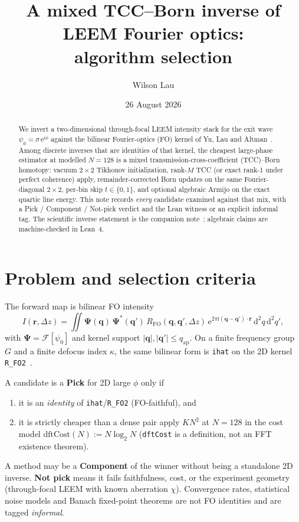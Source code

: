 \documentclass[11pt,a4paper]{article}
\title{A mixed TCC--Born inverse of LEEM Fourier optics:\\
algorithm selection}
\author{Wilson Lau}
\date{26 August 2026}
\theoremstyle{definition}
\theoremstyle{remark}
\newcommand{\ee}{\mathrm{e}}
\newcommand{\ii}{\mathrm{i}}
\newcommand{\dd}{\mathrm{d}}
\newcommand{\abs}[1]{\lvert#1\rvert}
\newcommand{\qap}{q_{\mathrm{ap}}}
\newcommand{\Dz}{\Delta z}
\newcommand{\RFO}{R_{\mathrm{FO}}}
\begin{document}
\maketitle

\begin{abstract}
We invert a two-dimensional through-focal LEEM intensity stack for the
exit wave $\psi_0=\sigma\,\ee^{\ii\phi}$ against the bilinear
Fourier-optics (FO) kernel of Yu, Lau and Altman~\cite{Yu2019}.
Among discrete inverses that are identities of that kernel, the
cheapest large-phase estimator at modelled $N=128$ is a mixed
transmission-cross-coefficient (TCC)--Born homotopy: vacuum
$2\times 2$ Tikhonov initialization, rank-$M$ TCC (or exact rank-1
under perfect coherence) apply, remainder-corrected Born updates on
the same Fourier-diagonal $2\times 2$, per-bin skip
$t\in\{0,1\}$, and optional algebraic Armijo on the exact quartic line
energy.
This note records \emph{every} candidate examined against that mix,
with a Pick / Component / Not-pick verdict and the Lean witness or
an explicit informal tag.
The scientific inverse statement is the companion
note~\cite{Lau2026inverse}; algebraic claims are machine-checked in
Lean~4.
\end{abstract}

\section{Problem and selection criteria}
\label{sec:criteria}

The forward map is bilinear FO intensity~\cite{Yu2019}
\begin{equation}
\label{eq:I}
I(\mathbf{r},\Dz)
=\iint
\boldsymbol{\Psi}(\mathbf{q})\,\boldsymbol{\Psi}^*(\mathbf{q}')
\,\RFO(\mathbf{q},\mathbf{q}',\Dz)
\,\ee^{2\pi\ii(\mathbf{q}-\mathbf{q}')\cdot\mathbf{r}}
\,\dd^2q\,\dd^2q',
\end{equation}
with $\boldsymbol{\Psi}=\mathcal{F}[\psi_0]$ and kernel support
$\abs{\mathbf{q}},\abs{\mathbf{q}'}\le\qap$.
On a finite frequency group $G$ and a finite defocus index $\kappa$,
the same bilinear form is \texttt{ihat} on the 2D kernel
\texttt{R\_FO2}~\cite{Lau2026proofs,Lau2026inverse}.

A candidate is a \textbf{Pick} for 2D large $\phi$ only if
\begin{enumerate}[leftmargin=*]
\item it is an \emph{identity} of \texttt{ihat}/\texttt{R\_FO2}
(FO-faithful), and
\item it is strictly cheaper than a dense pair apply $KN^2$ at
$N=128$ in the cost model $\mathrm{dftCost}(N):=N\log_2 N$
(\texttt{dftCost} is a definition, not an FFT existence theorem).
\end{enumerate}
A method may be a \textbf{Component} of the winner without being a
standalone 2D inverse.
\textbf{Not pick} means it fails faithfulness, cost, or the experiment
geometry (through-focal LEEM with known aberration $\chi$).
Convergence rates, statistical noise models and Banach fixed-point
theorems are not FO identities and are tagged \emph{informal}.
\end{document}
